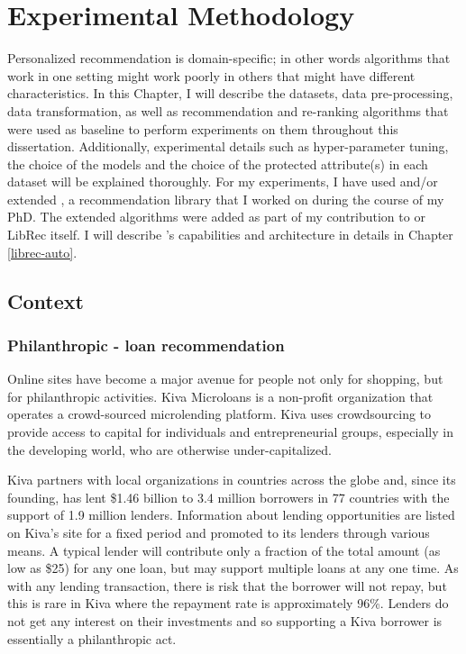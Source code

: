 \chapter{Experimental Methodology}
\label{chap:methodology}

Personalized recommendation is domain-specific; in other words algorithms that work in one setting might work poorly in others that might have different characteristics. \todo{\cite{}}
In this Chapter, I will describe the datasets, data pre-processing, data transformation, as well as recommendation and re-ranking algorithms that were used as baseline to perform experiments on them throughout this dissertation. 
Additionally, experimental details such as hyper-parameter tuning, the choice of the models and the choice of the protected attribute(s) in each dataset will be explained thoroughly. For my experiments, I have used and/or extended \libauto{}, a recommendation library that I worked on during the course of my PhD. The extended algorithms were added as part of my contribution to \libauto{} or LibRec itself. I will describe \libauto{}'s capabilities and architecture in details in Chapter \ref{librec-auto}.



\section{Context}
    \subsection{Philanthropic - loan recommendation}
    
    Online sites have become a major avenue for people not only for shopping, but for philanthropic activities. Kiva Microloans is a non-profit organization that operates a crowd-sourced microlending platform. Kiva uses crowdsourcing to provide access to capital for individuals and entrepreneurial groups, especially in the developing world, who are otherwise under-capitalized.
    
    Kiva partners with local organizations in countries across the globe and, since its founding, has lent \$1.46 billion to 3.4 million borrowers in 77 countries with the support of 1.9 million lenders. Information about lending opportunities are listed on Kiva's site for a fixed period and promoted to its lenders through various means. A typical lender will contribute only a fraction of the total amount (as low as \$25) for any one loan, but may support multiple loans at any one time. As with any lending transaction, there is risk that the borrower will not repay, but this is rare in Kiva where the repayment rate is approximately 96\%. Lenders do not get any interest on their investments and so supporting a Kiva borrower is essentially a philanthropic act.

